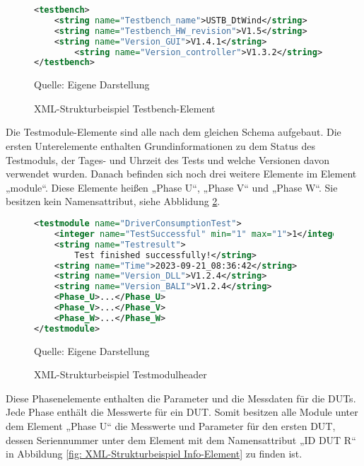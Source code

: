 \begin{figure}[H]
\centering
\begin{minipage}{0.95\textwidth}
\begin{lstlisting}[language=XML]
<testbench>
	<string name="Testbench_name">USTB_DtWind</string>
	<string name="Testbench_HW_revision">V1.5</string>
	<string name="Version_GUI">V1.4.1</string>
        <string name="Version_controller">V1.3.2</string>
</testbench>
\end{lstlisting}
\end{minipage}
\caption{XML-Strukturbeispiel Testbench-Element}
\label{fig: XML-Strukturbeispiel Testbench-Element}
    {Quelle: Eigene Darstellung}
\end{figure}


Die Testmodule-Elemente sind alle nach dem gleichen Schema aufgebaut. Die ersten Unterelemente enthalten Grundinformationen
zu dem Status des Testmoduls, der Tages- und Uhrzeit des Tests und welche Versionen davon verwendet wurden.
Danach befinden sich noch drei weitere Elemente im Element „module“.
Diese Elemente heißen „Phase U“, „Phase V“ und „Phase W“.
Sie besitzen kein Namensattribut, siehe Abblidung \ref{fig: XML-Strukturbeispiel Testmodulheader}.

\begin{figure}[H]
\centering
\begin{minipage}{0.95\textwidth}
\begin{lstlisting}[language=XML]
<testmodule name="DriverConsumptionTest">
	<integer name="TestSuccessful" min="1" max="1">1</integer>
	<string name="Testresult">
        Test finished successfully!</string>
	<string name="Time">2023-09-21_08:36:42</string>
	<string name="Version_DLL">V1.2.4</string>
	<string name="Version_BALI">V1.2.4</string>
    <Phase_U>...</Phase_U>
    <Phase_V>...</Phase_V>
    <Phase_W>...</Phase_W>
</testmodule>
\end{lstlisting}
\end{minipage}
\caption{XML-Strukturbeispiel Testmodulheader}
\label{fig: XML-Strukturbeispiel Testmodulheader}
    {Quelle: Eigene Darstellung}
\end{figure}

Diese Phasenelemente enthalten die Parameter und die Messdaten für die DUTs. Jede Phase enthält die Messwerte für ein DUT.
Somit besitzen alle Module unter dem Element „Phase U“ die Messwerte und Parameter für den ersten DUT, dessen Seriennummer
unter dem Element mit dem Namensattribut „ID DUT R“ in Abbildung \ref{fig: XML-Strukturbeispiel Info-Element} zu finden ist.

